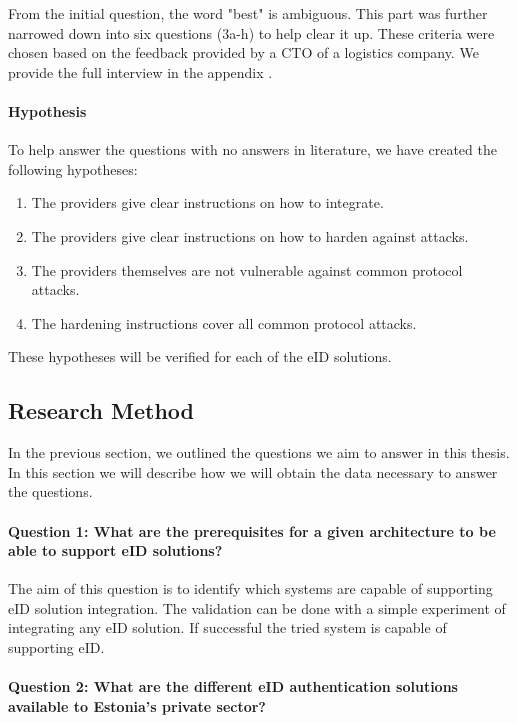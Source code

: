 From the initial question, the word "best" is ambiguous. This part was further narrowed down into six questions (3a-h) to help clear it up. These criteria were chosen based on the feedback provided by a CTO of a logistics company. We provide the full interview in the appendix .

\paragraph{Hypothesis} To help answer the questions with no answers in literature, we have created the following hypotheses:

\begin{enumerate}
    \item The providers give clear instructions on how to integrate.
    \item The providers give clear instructions on how to harden against attacks.
    \item The providers themselves are not vulnerable against common protocol attacks.
    \item The hardening instructions cover all common protocol attacks.
\end{enumerate}

These hypotheses will be verified for each of the eID solutions.

\subsection{Research Method}

In the previous section, we outlined the questions we aim to answer in this thesis. In this section we will describe how we will obtain the data necessary to answer the questions.

\paragraph{Question 1: What are the prerequisites for a given architecture to be able to support eID solutions?}\noindent

The aim of this question is to identify which systems are capable of supporting eID solution integration. The validation can be done with a simple experiment of integrating any eID solution. If successful the tried system is capable of supporting eID.

\paragraph{Question 2: What are the different eID authentication solutions available to Estonia's private sector?}\noindent

